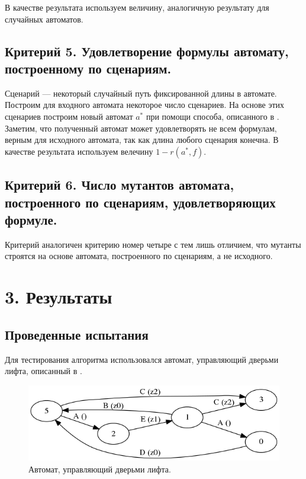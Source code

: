 \documentclass[12pt,fleqn]{article}
\begin{document}
В качестве результата используем величину, аналогичную результату для случайных автоматов.

\subsection*{Критерий 5. Удовлетворение формулы автомату, построенному по сценариям.}

Сценарий --- некоторый случайный путь фиксированной длины в автомате. Построим для входного автомата некоторое
число сценариев. На основе этих сценариев построим новый автомат $a^*$ при помощи способа, описанного в \cite{eg}.
Заметим, что полученный автомат может удовлетворять не всем формулам, верным для исходного автомата, так как
длина любого сценария конечна. В качестве результата используем велечину $1 - r(a^*, f)$.

\subsection*{Критерий 6. Число мутантов автомата, построенного по сценариям, удовлетворяющих формуле.}

Критерий аналогичен критерию номер четыре с тем лишь отличием, что мутанты строятся на основе автомата, построенного по
сценариям, а не исходного.

\section*{3. Результаты}

\subsection*{Проведенные испытания}

Для тестирования алгоритма использовался автомат, управляющий дверьми лифта, описанный в \cite[Sec 2.3.1]{eg}.

\begin{figure}[!hb]
  \centering
    \includegraphics[scale=0.5]{lift.png}
  \caption{Автомат, управляющий дверьми лифта.}
\end{figure}
\end{document}
